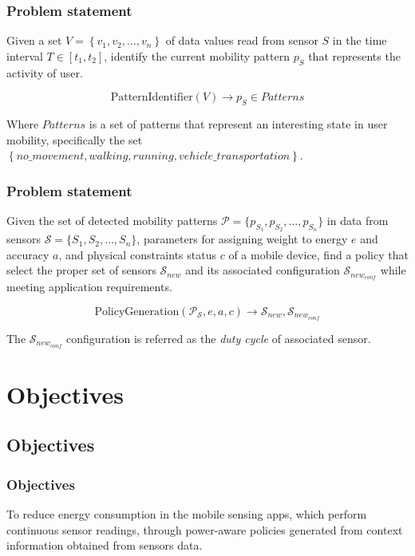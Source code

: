 \documentclass[compress,9pt,xcolor={dvipsnames,table}]{beamer}
\begin{document}
\begin{frame}\frametitle{Problem statement}
\begin{tcolorbox}[title=Problem statement: Mobility pattern identification,colframe=PineGreen]
\small
Given a set $V = \left\{v_{1}, v_{2}, \dotsc, v_{n}\right\}$ of data values read from sensor $S$ in the time interval $T  \in [t_{1}, t_{2}]$, identify the current mobility pattern $p_{S}$ that represents the activity of user.

\begin{equation}
  \text{PatternIdentifier}( V ) \longrightarrow{} p_{S} \in Patterns
\end{equation}

Where $Patterns$ is a set of patterns that represent an interesting state in user mobility, specifically the set $\left\{no\_movement, walking, running, vehicle\_transportation\right\}$.
\end{tcolorbox}
\end{frame}

\begin{frame}\frametitle{Problem statement}
\begin{tcolorbox}[title=Problem statement: Policy generation,colframe=PineGreen]
\small
Given the set of detected mobility patterns $\mathcal{P} = \{ p_{S_1}, p_{S_2}, \ldots, p_{S_n} \}$ in data from sensors $\mathcal{S} = \{ S_1,S_2,\ldots, S_n \}$, parameters for assigning weight to energy $e$ and accuracy $a$, and physical constraints status $c$ of a mobile device, find a policy that select the proper set of sensors $\mathcal{S}_{new}$ and its associated configuration $\mathcal{S}_{new_{conf}}$  while meeting application requirements.

\begin{equation}
  \text{PolicyGeneration}( \mathcal{P}_{\mathcal{S}}, e, a, c ) \longrightarrow{} \mathcal{S}_{new}, \mathcal{S}_{new_{conf}}
\end{equation}

The $\mathcal{S}_{new_{conf}}$ configuration is referred as the \emph{duty cycle} of associated sensor.
\end{tcolorbox}
\end{frame}

\section{Objectives}
\subsection{Objectives}
\begin{frame}\frametitle{Objectives}
\begin{tcolorbox}[title=Main objective,colframe=PineGreen]
To reduce energy consumption in the mobile sensing apps, which perform continuous sensor readings, through power-aware policies generated from context information obtained from sensors data.
\end{tcolorbox}
\end{frame}
\end{document}
